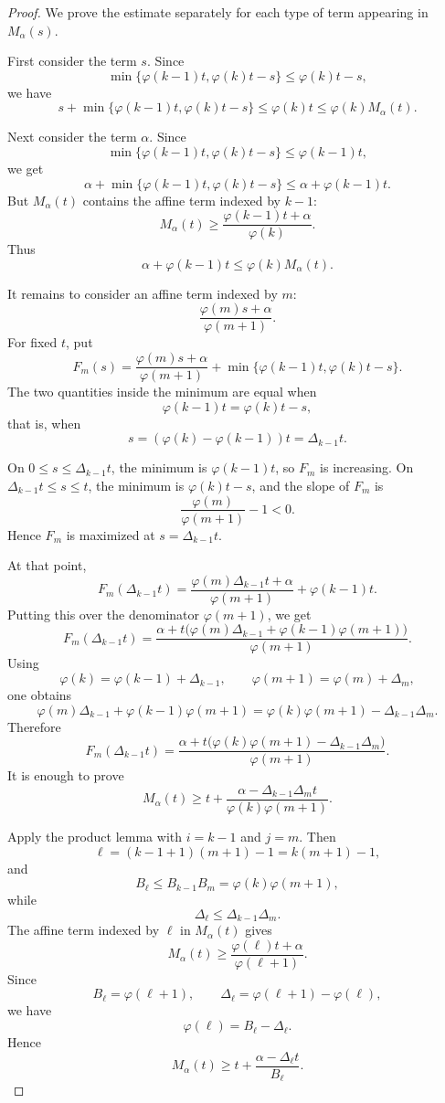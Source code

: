 \documentclass[11pt]{article}
\newcommand{\ph}{\varphi}
\newcommand{\Bell}[1]{B_{#1}}
\newcommand{\Delt}[1]{\Delta_{#1}}
\begin{document}
\begin{proof}
We prove the estimate separately for each type of term appearing in
\(M_\alpha(s)\).

First consider the term \(s\).  Since
\[
 \min\{\ph(k-1)t,\ph(k)t-s\}\le \ph(k)t-s,
\]
we have
\[
 s+\min\{\ph(k-1)t,\ph(k)t-s\}
 \le
 \ph(k)t
 \le
 \ph(k)M_\alpha(t).
\]

Next consider the term \(\alpha\).  Since
\[
 \min\{\ph(k-1)t,\ph(k)t-s\}\le \ph(k-1)t,
\]
we get
\[
 \alpha+\min\{\ph(k-1)t,\ph(k)t-s\}
 \le
 \alpha+\ph(k-1)t.
\]
But \(M_\alpha(t)\) contains the affine term indexed by \(k-1\):
\[
 M_\alpha(t)
 \ge
 \frac{\ph(k-1)t+\alpha}{\ph(k)}.
\]
Thus
\[
 \alpha+\ph(k-1)t\le \ph(k)M_\alpha(t).
\]

It remains to consider an affine term indexed by \(m\):
\[
 \frac{\ph(m)s+\alpha}{\ph(m+1)}.
\]
For fixed \(t\), put
\[
 F_m(s)
 =
 \frac{\ph(m)s+\alpha}{\ph(m+1)}
 +
 \min\{\ph(k-1)t,\ph(k)t-s\}.
\]
The two quantities inside the minimum are equal when
\[
 \ph(k-1)t=\ph(k)t-s,
\]
that is, when
\[
 s=(\ph(k)-\ph(k-1))t=\Delt{k-1}t.
\]

On \(0\le s\le \Delt{k-1}t\), the minimum is \(\ph(k-1)t\), so \(F_m\) is
increasing.  On \(\Delt{k-1}t\le s\le t\), the minimum is \(\ph(k)t-s\),
and the slope of \(F_m\) is
\[
 \frac{\ph(m)}{\ph(m+1)}-1<0.
\]
Hence \(F_m\) is maximized at \(s=\Delt{k-1}t\).

At that point,
\[
 F_m(\Delt{k-1}t)
 =
 \frac{\ph(m)\Delt{k-1}t+\alpha}{\ph(m+1)}
 +
 \ph(k-1)t.
\]
Putting this over the denominator \(\ph(m+1)\), we get
\[
 F_m(\Delt{k-1}t)
 =
 \frac{
 \alpha
 +
 t\bigl(\ph(m)\Delt{k-1}
       +\ph(k-1)\ph(m+1)\bigr)
 }{\ph(m+1)}.
\]
Using
\[
 \ph(k)=\ph(k-1)+\Delt{k-1},
 \qquad
 \ph(m+1)=\ph(m)+\Delt{m},
\]
one obtains
\[
 \ph(m)\Delt{k-1}
 +\ph(k-1)\ph(m+1)
 =
 \ph(k)\ph(m+1)-\Delt{k-1}\Delt{m}.
\]
Therefore
\[
 F_m(\Delt{k-1}t)
 =
 \frac{
 \alpha
 +
 t\bigl(\ph(k)\ph(m+1)-\Delt{k-1}\Delt{m}\bigr)
 }{\ph(m+1)}.
\]
It is enough to prove
\[
 M_\alpha(t)
 \ge
 t+
 \frac{\alpha-\Delt{k-1}\Delt{m}t}
      {\ph(k)\ph(m+1)}.
\]

Apply the product lemma with \(i=k-1\) and \(j=m\).  Then
\[
 \ell=(k-1+1)(m+1)-1=k(m+1)-1,
\]
and
\[
 \Bell{\ell}\le \Bell{k-1}\Bell{m}
 =
 \ph(k)\ph(m+1),
\]
while
\[
 \Delt{\ell}\le \Delt{k-1}\Delt{m}.
\]
The affine term indexed by \(\ell\) in \(M_\alpha(t)\) gives
\[
 M_\alpha(t)
 \ge
 \frac{\ph(\ell)t+\alpha}{\ph(\ell+1)}.
\]
Since
\[
 \Bell{\ell}=\ph(\ell+1),
 \qquad
 \Delt{\ell}=\ph(\ell+1)-\ph(\ell),
\]
we have
\[
 \ph(\ell)=\Bell{\ell}-\Delt{\ell}.
\]
Hence
\[
 M_\alpha(t)
 \ge
 t+\frac{\alpha-\Delt{\ell}t}{\Bell{\ell}}.
\]


\end{proof}
\end{document}
